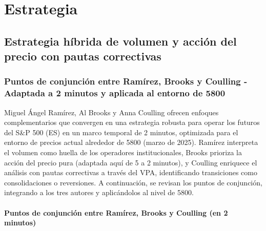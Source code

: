 
\chapter{Estrategia}  %

\section{Estrategia h\'{i}brida de volumen y acci\'on del precio con pautas correctivas}

\subsection{Puntos de conjunci\'on entre Ram\'irez, Brooks y Coulling - Adaptada a 2 minutos y aplicada al entorno de 5800}

Miguel \'Angel Ram\'irez, Al Brooks y Anna Coulling ofrecen enfoques complementarios que convergen en una estrategia robusta para operar los futuros del S\&P 500 (ES) en un marco temporal de 2 minutos, optimizada para el entorno de precios actual alrededor de 5800 (marzo de 2025). Ram\'irez interpreta el volumen como huella de los operadores institucionales, Brooks prioriza la acci\'{o}n del precio pura (adaptada aqu\'i de 5 a 2 minutos), y Coulling enriquece el an\'alisis con pautas correctivas a trav\'es del VPA, identificando transiciones como consolidaciones o reversiones. A continuaci\'{o}n, se revisan los puntos de conjunci\'{o}n, integrando a los tres autores y aplic\'andolos al nivel de 5800.

\subsubsection{Puntos de conjunci\'on entre Ram\'irez, Brooks y Coulling (en 2 minutos)}

